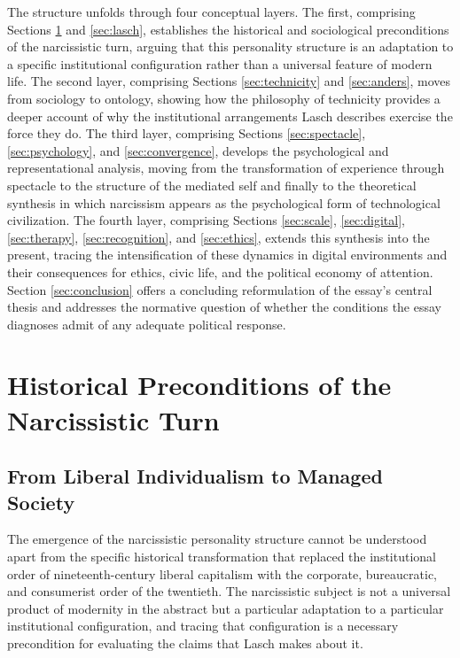 \documentclass[12pt]{memoir}
\begin{document}
The structure unfolds through four conceptual layers. The first, comprising Sections
\ref{sec:history} and \ref{sec:lasch}, establishes the historical and sociological
preconditions of the narcissistic turn, arguing that this personality structure is an
adaptation to a specific institutional configuration rather than a universal feature of
modern life. The second layer, comprising Sections \ref{sec:technicity} and
\ref{sec:anders}, moves from sociology to ontology, showing how the philosophy of
technicity provides a deeper account of why the institutional arrangements Lasch describes
exercise the force they do. The third layer, comprising Sections \ref{sec:spectacle},
\ref{sec:psychology}, and \ref{sec:convergence}, develops the psychological and
representational analysis, moving from the transformation of experience through spectacle
to the structure of the mediated self and finally to the theoretical synthesis in which
narcissism appears as the psychological form of technological civilization. The fourth
layer, comprising Sections \ref{sec:scale}, \ref{sec:digital}, \ref{sec:therapy},
\ref{sec:recognition}, and \ref{sec:ethics}, extends this synthesis into the present,
tracing the intensification of these dynamics in digital environments and their
consequences for ethics, civic life, and the political economy of attention. Section
\ref{sec:conclusion} offers a concluding reformulation of the essay's central thesis and
addresses the normative question of whether the conditions the essay diagnoses admit of
any adequate political response.

\section{Historical Preconditions of the Narcissistic Turn}
\label{sec:history}

\subsection{From Liberal Individualism to Managed Society}

The emergence of the narcissistic personality structure cannot be understood apart from
the specific historical transformation that replaced the institutional order of
nineteenth-century liberal capitalism with the corporate, bureaucratic, and consumerist
order of the twentieth. The narcissistic subject is not a universal product of modernity
in the abstract but a particular adaptation to a particular institutional configuration,
and tracing that configuration is a necessary precondition for evaluating the claims that
Lasch makes about it.
\end{document}
